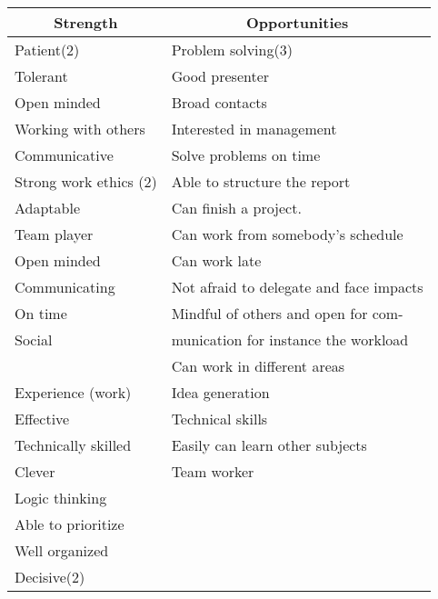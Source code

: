 \begin{table}[h]
\begin{tabular}{|p{}|p{}|}
\hline
\multicolumn{1}{|c|}{\textbf {Strength}}                                                  & \multicolumn{1}{c|}{\textbf{Opportunities}}                          \\ \hline
Patient(2)                              & Problem solving(3)\\
Tolerant                                & Good presenter\\
Open minded                             & Broad contacts\\
Working with others                     & Interested in management\\ %
Communicative                           & Solve problems on time\\
Strong work ethics (2)                  & Able to structure the report\\
Adaptable                               & Can finish a project. \\
Team player                             & Can work from somebody's schedule\\
Open minded                             & Can work late\\
Communicating                           & Not afraid to delegate and face impacts\\
On time                                 & Mindful of others and open for com-\\
Social                                  & munication for instance the workload\\
                                        & Can work in different areas\\
Experience (work)                       & Idea generation\\
Effective                               & Technical skills\\
Technically skilled                     & Easily can learn other subjects\\
Clever                                  & Team worker\\
Logic thinking                          &\\
Able to prioritize                      &\\
Well organized                          & \\
Decisive(2)                             &\\

\end{tabular}
\end{table}
